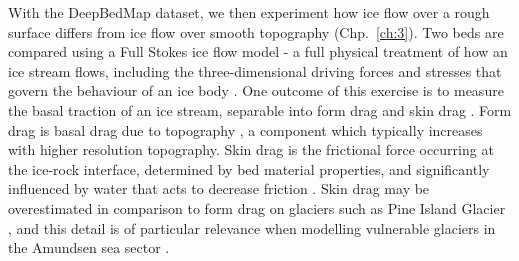 With the DeepBedMap dataset, we then experiment how ice flow over a rough surface differs from ice flow over smooth topography (Chp.~\ref{ch:3}).
Two beds are compared using a Full Stokes ice flow model - a full physical treatment of how an ice stream flows, including the three-dimensional driving forces and stresses that govern the behaviour of an ice body \citep{LarourContinentalscalehigh2012}.
One outcome of this exercise is to measure the basal traction of an ice stream, separable into form drag and skin drag \citep[Fig.~\ref{fig:1.3},][]{BinghamDiverselandscapesPine2017,Kyrke-SmithRelevanceDetailBasal2018,Minchewuniversalglacierslip2020,SchoofBasalperturbationsice2002}.
Form drag is basal drag due to topography \citep[c.f.][]{WeertmanSlidingGlaciers1957}, a component which typically increases with higher resolution topography.
Skin drag is the frictional force occurring at the ice-rock interface, determined by bed material properties, and significantly influenced by water that acts to decrease friction \citep{IversonExperimentsdynamicssedimentary2015}.
Skin drag may be overestimated in comparison to form drag on glaciers such as Pine Island Glacier \citep{BinghamDiverselandscapesPine2017,Kyrke-SmithRelevanceDetailBasal2018}, and this detail is of particular relevance when modelling vulnerable glaciers in the Amundsen sea sector \citep{Kyrke-SmithRelevanceDetailBasal2018}.


